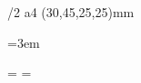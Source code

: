 \fontfam[Termes]
\typosize[11/13]
\margins/2 a4 (30,45,25,25)mm

  
\frenchspacing
\emergencystretch=3em

\gdef\thetitle{}
\gdef\theauthor{}
\headline={\ifodd\pageno
  {\it\thetitle}\hfil\folio
\else
  \folio\hfil{\it\theauthor}%
\fi}
\footline={}
